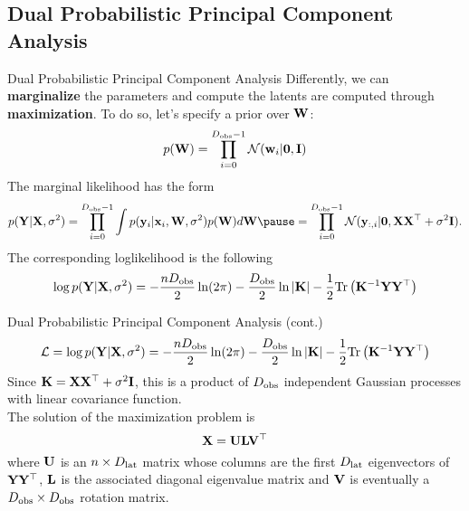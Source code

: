 \subsection{Dual Probabilistic Principal Component Analysis}
\begin{frame}{Dual Probabilistic Principal Component Analysis}
    Differently, we can \textbf{marginalize} the parameters and compute the latents are computed through \textbf{maximization}. To do so, let's specify a prior over $\mathbf{W}$:
    \begin{equation}
        p(\mathbf{W}) = \prod_{i=0}^{D_\mathrm{obs}-1}\mathcal{N}(\mathbf{w}_i\vert\mathbf{0},\mathbf{I})
    \end{equation}
    \pause
    The marginal likelihood has the form
    \begin{equation}
        p(\Yvect\vert\Xvect, \sigma^2) = \prod_{i=0}^{\Dobs-1} \int p(\yvect_i\vert\xvect_i,\Wvect, \sigma^2) p(\Wvect) d\Wvect \pause = \prod_{i=0}^{\Dobs-1} \N(\yvect_{:,i}|\zerovect, \Xvect\Xvect^\top+\sigma^2\Ivect).
    \end{equation}
    \pause
    The corresponding loglikelihood is the following
    \begin{equation}
        \log p(\mathbf{Y}\vert\mathbf{X},\sigma^2) =  -\dfrac{nD_\mathrm{obs}}{2}\ln(2\pi) - \dfrac{D_\mathrm{obs}}{2}\ln\vert\mathbf{K}\vert - \dfrac{1}{2}\mathrm{Tr}\left(\mathbf{K}^{-1}\mathbf{Y}\mathbf{Y}^\top\right)
    \end{equation}
\end{frame}

\begin{frame}{Dual Probabilistic Principal Component Analysis (cont.)}
    \begin{equation}
        \mathcal{L} = \log p(\mathbf{Y}\vert\mathbf{X},\sigma^2) =  -\dfrac{nD_\mathrm{obs}}{2}\ln(2\pi) - \dfrac{D_\mathrm{obs}}{2}\ln\vert\mathbf{K}\vert - \dfrac{1}{2}\mathrm{Tr}\left(\mathbf{K}^{-1}\mathbf{Y}\mathbf{Y}^\top\right)
    \end{equation}
    Since $\mathbf{K} = \mathbf{X}\mathbf{X}^\top+\sigma^2\mathbf{I}$, this is a product of $D_\mathrm{obs}$ independent Gaussian processes with linear covariance function.\\
    \pause
    The solution of the maximization problem is
    \begin{equation}
        \mathbf{X} = \mathbf{U}\mathbf{L}\mathbf{V}^\top
    \end{equation}
    where $\mathbf{U}$ is an $n\times D_\mathrm{lat}$ matrix whose columns are the first $D_\mathrm{lat}$ eigenvectors of $\mathbf{Y}\mathbf{Y}^\top$, $\mathbf{L}$ is the associated diagonal eigenvalue matrix and $\mathbf{V}$ is eventually a $D_\mathrm{obs}\times D_\mathrm{obs}$ rotation matrix.
\end{frame}

